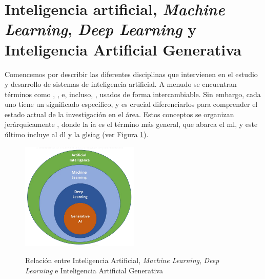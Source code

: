
\section{Inteligencia artificial, \emph{Machine Learning}, \emph{Deep Learning} y Inteligencia Artificial Generativa}

Comencemos por describir las diferentes disciplinas que intervienen en el estudio y desarrollo de sistemas de inteligencia artificial. A menudo se encuentran términos como , ,  e, incluso, , usados de forma intercambiable. Sin embargo, cada uno tiene un significado específico, y es crucial diferenciarlos para comprender el estado actual de la investigación en el área. Estos conceptos se organizan jerárquicamente \citep{torresivinalsPythonDeepLearning2020}, donde la  \gls{ia} es el término más general, que abarca el \gls{ml}, y este último incluye al \gls{dl} y la gls{iag} (ver Figura \ref{fig:ai_ml_dl_gai}).

\begin{figure}[H]
    \caption[Relación entre Inteligencia Artificial, \emph{Machine Learning}, \emph{Deep Learning} y \emph{Generative AI}]{Relación entre Inteligencia Artificial, \emph{Machine Learning}, \emph{Deep Learning} e Inteligencia Artificial Generativa}
    \centering
    \includegraphics[width=0.5\textwidth]{./figuras/ai_ml_dl_gai.png}
    \label{fig:ai_ml_dl_gai}
\end{figure}

